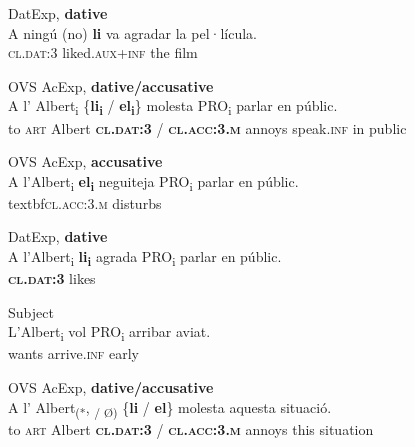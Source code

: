 \documentclass[output=paper,colorlinks,citecolor=brown,modfonts,nonflat]{langsci/langscibook}
\begin{document}
 \ex  DatExp, \textbf{dative} \label{ex:royo:11c}\\
 \gll  A ningú (no) \textbf{li} va agradar la pel·lícula. \\
  \textsc{cl.dat:3} liked.\textsc{aux+inf} the film\\
\glt {}

 
 
  \z
  \z


\ea%
 \label{ex:royo:12}
 \ea OVS AcExp, \textbf{dative/accusative} \label{ex:royo:12a}\\
 \gll  A l’ Albert\textsubscript{i} \{\textbf{li\textsubscript{i}} / \textbf{el\textsubscript{i}}\} molesta PRO\textsubscript{i} parlar en públic.\\
 to \textsc{art} Albert \textbf{\textsc{cl.dat:3}} / \textbf{\textsc{cl.acc:3.m}} annoys speak.\textsc{inf} in public\\
\glt {}
 
 \ex OVS AcExp, \textbf{accusative}\label{ex:royo:12b}\\
 \gll A l’Albert\textsubscript{i} \textbf{el\textsubscript{i}} neguiteja PRO\textsubscript{i} parlar en públic.\\
  textbf{\textsc{cl.acc:3.m}} disturbs\\
\glt {}
 
 \ex DatExp, \textbf{dative}\label{ex:royo:12c}\\
 \gll A l’Albert\textsubscript{i} \textbf{li\textsubscript{i}} agrada PRO\textsubscript{i} parlar en públic.\\
   \textbf{\textsc{cl.dat:3}} likes\\
\glt {}
 
 \ex Subject\label{ex:royo:12d}\\
 \gll L’Albert\textsubscript{i} vol PRO\textsubscript{i} arribar aviat.\\
  wants arrive.\textsc{inf} early\\
\glt {}
 
 \z
 \z


 
\ea%
 \label{ex:royo:13}
 \ea OVS AcExp, \textbf{dative/accusative}\label{ex:royo:13a}\\
 \gll A l’ Albert\textsubscript{(*}, \textsubscript{/ Ø)} \{\textbf{li} / \textbf{el}\} molesta aquesta situació.\\
 to \textsc{art} Albert \textbf{\textsc{cl.dat:3}} / \textbf{\textsc{cl.acc:3.m}} annoys this situation\\
\glt {}
 
\end{document}
